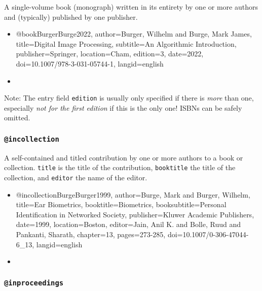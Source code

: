 A single-volume book (monograph) written in its entirety by one or more authors
and (typically) published by one publisher.
% 
\begin{itemize}
\item[]
\begin{GenericCode}[numbers=none]
@book{BurgerBurge2022,
	author={Burger, Wilhelm and Burge, Mark James},
	title={Digital Image Processing},
	subtitle={An Algorithmic Introduction},
	publisher={Springer},
	location={Cham},
	edition={3},
	date={2022},
	doi={10.1007/978-3-031-05744-1},
	langid={english}
}
\end{GenericCode}
\item[\cite{BurgerBurge2022}] 
\end{itemize}
%
Note: The entry field \texttt{edition} is usually only specified if there
is \emph{more} than one, especially \emph{not for the first
edition} if this is the only one! ISBNs can be safely omitted.



\subsubsection{\texttt{\bfseries @incollection}}
\label{sec:@incollection}

A self-contained and titled contribution by one or more authors to a book or
collection. \texttt{title} is the title of the contribution, \texttt{booktitle}
the title of the collection, and \texttt{editor} the name of the editor.
%
\begin{itemize}
\item[]
\begin{GenericCode}[numbers=none]
@incollection{BurgeBurger1999,
  author={Burge, Mark and Burger, Wilhelm},
  title={Ear Biometrics},
  booktitle={Biometrics},
  booksubtitle={Personal Identification in Networked Society},
  publisher={Kluwer Academic Publishers},
  date={1999},
  location={Boston},
  editor={Jain, Anil K. and Bolle, Ruud and Pankanti, Sharath},
  chapter={13},
  pages={273-285},
  doi={10.1007/0-306-47044-6_13},
  langid={english}
}
\end{GenericCode}
\item[\cite{BurgeBurger1999}] 
\end{itemize}



\subsubsection{\texttt{\bfseries @inproceedings}}
\label{sec:@inproceedings}

